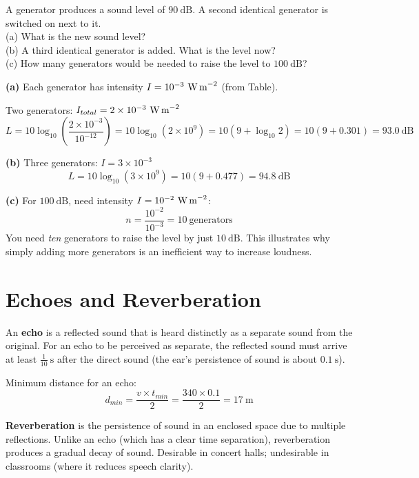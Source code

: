 \begin{examplebox}[18.2]
A generator produces a sound level of $90\ \text{dB}$.
A second identical generator is switched on next to it.\\
(a) What is the new sound level?\\
(b) A third identical generator is added. What is
the level now?\\
(c) How many generators would be needed to raise the
level to $100\ \text{dB}$?
\end{examplebox}

\begin{solutionbox}
\textbf{(a)} Each generator has intensity
$I = 10^{-3}\ \text{W\,m}^{-2}$ (from Table).

Two generators: $I_{total} = 2 \times 10^{-3}\ \text{W\,m}^{-2}$
\[
  L = 10\log_{10}\left(\frac{2\times10^{-3}}{10^{-12}}\right)
  = 10\log_{10}(2\times10^9)
  = 10(9 + \log_{10}2)
  = 10(9 + 0.301) = 93.0\ \text{dB}
\]

\textbf{(b)} Three generators: $I = 3\times10^{-3}$
\[
  L = 10\log_{10}(3\times10^9) = 10(9+0.477)
  = 94.8\ \text{dB}
\]

\textbf{(c)} For $100\ \text{dB}$, need intensity
$I = 10^{-2}\ \text{W\,m}^{-2}$:
\[
  n = \frac{10^{-2}}{10^{-3}} = 10\ \text{generators}
\]
You need \textit{ten} generators to raise the level
by just $10\ \text{dB}$. This illustrates why simply
adding more generators is an inefficient way to
increase loudness.
\end{solutionbox}

\section{Echoes and Reverberation}

\begin{definitionbox}
An \textbf{echo} is a reflected sound that is heard
distinctly as a separate sound from the original.
For an echo to be perceived as separate, the reflected
sound must arrive at least $\frac{1}{10}\ \text{s}$
after the direct sound (the ear's persistence of
sound is about $0.1\ \text{s}$).

Minimum distance for an echo:
\[
  d_{min} = \frac{v \times t_{min}}{2}
  = \frac{340 \times 0.1}{2} = 17\ \text{m}
\]

\textbf{Reverberation} is the persistence of sound
in an enclosed space due to multiple reflections.
Unlike an echo (which has a clear time separation),
reverberation produces a gradual decay of sound.
Desirable in concert halls; undesirable in classrooms
(where it reduces speech clarity).
\end{definitionbox}

